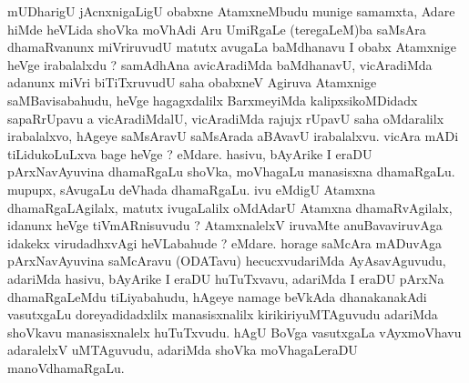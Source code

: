 
\begin{artha}
mUDharigU jAcnxnigaLigU obabxne AtamxneMbudu munige samamxta, Adare hiMde heVLida shoVka moVhAdi Aru UmiRgaLe (teregaLeM)ba saMsAra dhamaRvanunx miVriruvudU matutx avugaLa baMdhanavu I obabx Atamxnige heVge irabalalxdu ? samAdhAna avicAradiMda baMdhanavU, vicAradiMda adanunx miVri biTiTxruvudU saha obabxneV Agiruva Atamxnige saMBavisabahudu, heVge hagagxdalilx BarxmeyiMda kalipxsikoMDidadx sapaRrUpavu a vicAradiMdalU, vicAradiMda rajujx rUpavU saha oMdaralilx irabalalxvo, hAgeye saMsAravU saMsArada aBAvavU irabalalxvu. vicAra mADi tiLidukoLuLxva bage heVge ? eMdare. hasivu, bAyArike I eraDU pArxNavAyuvina dhamaRgaLu shoVka, moVhagaLu manasisxna dhamaRgaLu. mupupx, sAvugaLu deVhada dhamaRgaLu. ivu eMdigU Atamxna dhamaRgaLAgilalx, matutx ivugaLalilx oMdAdarU Atamxna dhamaRvAgilalx, idanunx heVge tiVmARnisuvudu ? AtamxnalelxV iruvaMte anuBavaviruvAga idakekx virudadhxvAgi heVLabahude ? eMdare. horage saMcAra mADuvAga pArxNavAyuvina saMcAravu (ODATavu) hecucxvudariMda AyAsavAguvudu, adariMda hasivu, bAyArike I eraDU huTuTxvavu, adariMda I eraDU pArxNa dhamaRgaLeMdu tiLiyabahudu, hAgeye namage beVkAda dhanakanakAdi vasutxgaLu doreyadidadxlilx manasisxnalilx kirikiriyuMTAguvudu adariMda shoVkavu manasisxnalelx huTuTxvudu. hAgU BoVga vasutxgaLa vAyxmoVhavu adaralelxV uMTAguvudu, adariMda shoVka moVhagaLeraDU manoVdhamaRgaLu.
\end{artha}


